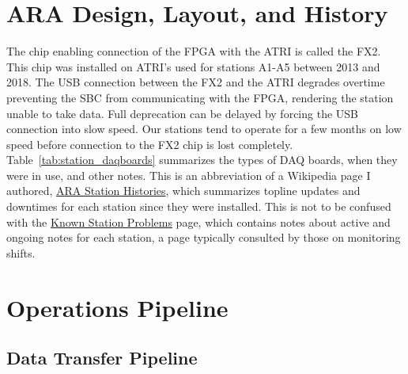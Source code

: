 \section{ARA Design, Layout, and History}

        The chip enabling connection of the FPGA with the ATRI is called the FX2.
        This chip was installed on ATRI's used for stations A1-A5 between 2013 and 2018. 
        The USB connection between the FX2 and the ATRI degrades overtime preventing the SBC from communicating with the FPGA, rendering the station unable to take data. 
        Full deprecation can be delayed by forcing the USB connection into slow speed. 
        Our stations tend to operate for a few months on low speed before connection to the FX2 chip is lost completely.
        Table~\ref{tab:station_daqboards} summarizes the types of DAQ boards, when they were in use, and other notes.
        This is an abbreviation of a Wikipedia page I authored, \href{https://mediawiki.icecube.wisc.edu/ara/index.php/ARA_Station_Histories}{ARA Station Histories}, which summarizes topline updates and downtimes for each station since they were installed. 
        This is not to be confused with the \href{https://mediawiki.icecube.wisc.edu/ara/index.php/Known_Station_Problems}{Known Station Problems} page, which contains notes about active and ongoing notes for each station, a page typically consulted by those on monitoring shifts. 

\section{Operations Pipeline}

    \subsection{Data Transfer Pipeline}
  
